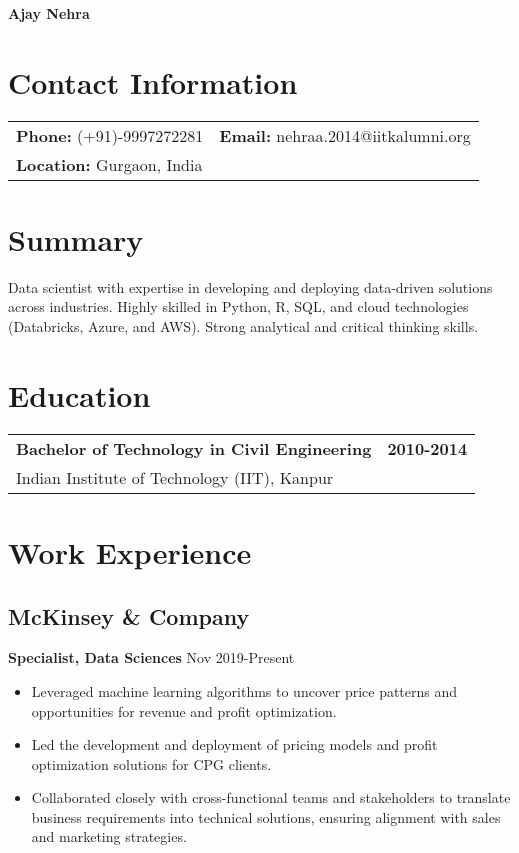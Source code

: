\documentclass[a4paper,10pt]{article}
\begin{document}
\begin{center}
    \textbf{\Huge Ajay Nehra}
\end{center}

\section*{Contact Information}
\begin{tabularx}{\textwidth}{@{}lX}
    \textbf{Phone:} (+91)-9997272281 & \textbf{Email:} nehraa.2014@iitkalumni.org \\
    \textbf{Location:} Gurgaon, India &
\end{tabularx}

\section*{Summary}
Data scientist with expertise in developing and deploying data-driven solutions across industries. Highly skilled in Python, R, SQL, and cloud technologies (Databricks, Azure, and AWS). Strong analytical and critical thinking skills.

\section*{Education}
\begin{tabularx}{\textwidth}{@{}Xr}
    \textbf{Bachelor of Technology in Civil Engineering} & \textbf{2010-2014} \\
    Indian Institute of Technology (IIT), Kanpur &
\end{tabularx}

\section*{Work Experience}
\subsection*{McKinsey \& Company}
\textbf{Specialist, Data Sciences} \hfill Nov 2019-Present
\begin{itemize}[leftmargin=*]
    \item Leveraged machine learning algorithms to uncover price patterns and opportunities for revenue and profit optimization.
    \item Led the development and deployment of pricing models and profit optimization solutions for CPG clients.
    \item Collaborated closely with cross-functional teams and stakeholders to translate business requirements into technical solutions, ensuring alignment with sales and marketing strategies.
\end{itemize}
\end{document}
